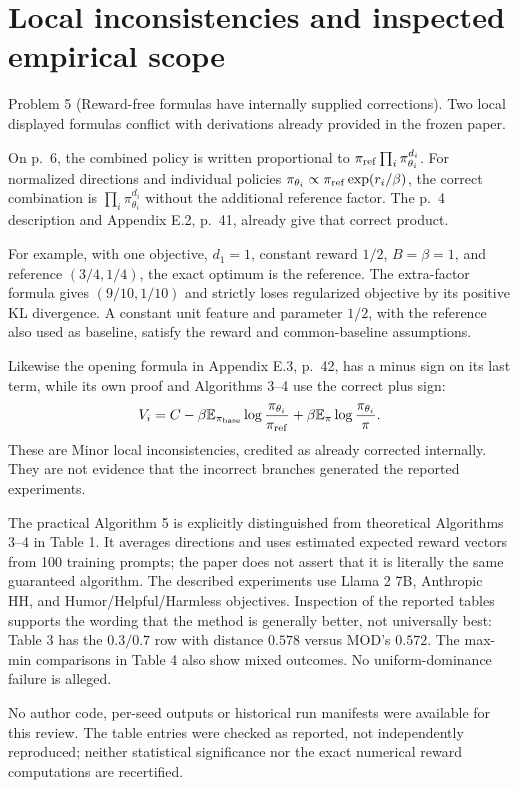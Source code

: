\documentclass[10pt]{article}
\begin{document}
\section*{Local inconsistencies and inspected empirical scope}
Problem 5 (Reward-free formulas have internally supplied corrections).  Two local displayed formulas conflict with derivations already provided in the frozen paper.\par
On p. 6, the combined policy is written proportional to \(\pi_{\rm ref}\prod_i\pi_{\theta_i}^{d_i}\). For normalized directions and individual policies \(\pi_{\theta_i}\propto\pi_{\rm ref}\exp(r_i/\beta)\), the correct combination is \(\prod_i\pi_{\theta_i}^{d_i}\) without the additional reference factor. The p. 4 description and Appendix E.2, p. 41, already give that correct product.\par
For example, with one objective, \(d_1=1\), constant reward \(1/2\), \(B=\beta=1\), and reference \((3/4,1/4)\), the exact optimum is the reference. The extra-factor formula gives \((9/10,1/10)\) and strictly loses regularized objective by its positive KL divergence. A constant unit feature and parameter \(1/2\), with the reference also used as baseline, satisfy the reward and common-baseline assumptions.\par
Likewise the opening formula in Appendix E.3, p. 42, has a minus sign on its last term, while its own proof and Algorithms 3–4 use the correct plus sign: \[V_i=C-\beta\mathbb E_{\pi_{\rm base}}
       \log\frac{\pi_{\theta_i}}{\pi_{\rm ref}}
       +\beta\mathbb E_\pi\log\frac{\pi_{\theta_i}}{\pi}.\] These are Minor local inconsistencies, credited as already corrected internally. They are not evidence that the incorrect branches generated the reported experiments.\par
The practical Algorithm 5 is explicitly distinguished from theoretical Algorithms 3–4 in Table 1. It averages directions and uses estimated expected reward vectors from 100 training prompts; the paper does not assert that it is literally the same guaranteed algorithm. The described experiments use Llama 2 7B, Anthropic HH, and Humor/Helpful/Harmless objectives. Inspection of the reported tables supports the wording that the method is generally better, not universally best: Table 3 has the \(0.3/0.7\) row with distance \(0.578\) versus MOD’s \(0.572\). The max-min comparisons in Table 4 also show mixed outcomes. No uniform-dominance failure is alleged.\par
No author code, per-seed outputs or historical run manifests were available for this review. The table entries were checked as reported, not independently reproduced; neither statistical significance nor the exact numerical reward computations are recertified.\par
\end{document}
